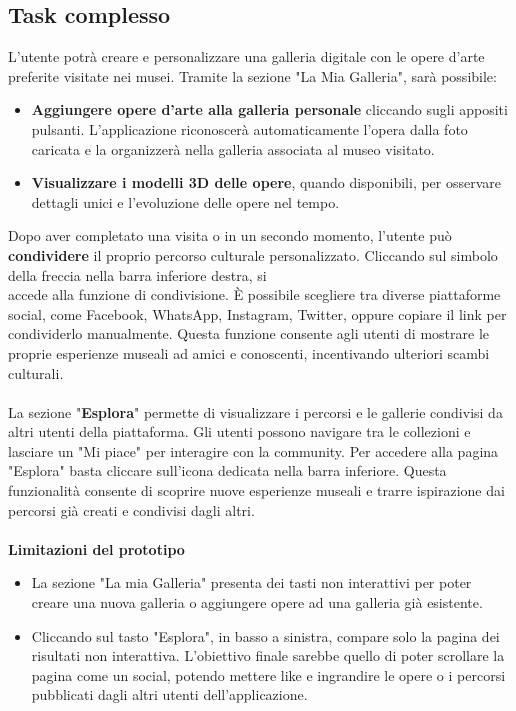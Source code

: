 \documentclass{article}
\begin{document}
\subsection{Task complesso}
L’utente potrà creare e personalizzare una galleria digitale con le opere d’arte preferite visitate nei musei. Tramite la sezione "La Mia Galleria", sarà possibile:
\begin{itemize}
\item \textbf{Aggiungere opere d’arte alla galleria personale} cliccando sugli appositi pulsanti. L’applicazione riconoscerà automaticamente l’opera dalla foto caricata e la organizzerà nella galleria associata al museo visitato.
\item \textbf{Visualizzare i modelli 3D delle opere}, quando disponibili, per osservare dettagli unici e l’evoluzione delle opere nel tempo.
\end{itemize}
Dopo aver completato una visita o in un secondo momento, l’utente può \textbf{condividere} il proprio percorso culturale personalizzato. Cliccando sul simbolo della freccia nella barra inferiore destra, si \\ accede alla funzione di condivisione. È possibile scegliere tra diverse piattaforme social, come Facebook, WhatsApp, Instagram, Twitter, oppure copiare il link per condividerlo manualmente. Questa funzione consente agli utenti di mostrare le proprie esperienze museali ad amici e conoscenti, incentivando ulteriori scambi culturali.\\
\\
La sezione "\textbf{Esplora}" permette di visualizzare i percorsi e le gallerie condivisi da altri utenti della piattaforma. Gli utenti possono navigare tra le collezioni e lasciare un "Mi piace" per interagire con la community. Per accedere alla pagina "Esplora" basta cliccare sull’icona dedicata nella barra inferiore. Questa funzionalità consente di scoprire nuove esperienze museali e trarre ispirazione dai percorsi già creati e condivisi dagli altri.\\
\\
\textbf{Limitazioni del prototipo}
\begin{itemize}
\item La sezione "La mia Galleria" presenta dei tasti non interattivi per poter creare una nuova galleria o aggiungere opere ad una galleria già esistente.
\item Cliccando sul tasto "Esplora", in basso a sinistra, compare solo la pagina dei risultati non interattiva. L'obiettivo finale sarebbe quello di poter scrollare la pagina come un social, potendo mettere like e ingrandire le opere o i percorsi pubblicati dagli altri utenti dell’applicazione.
\end{itemize}
\end{document}
